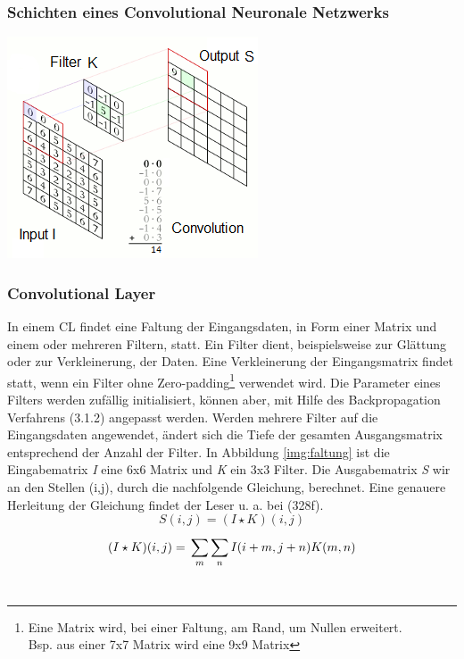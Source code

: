 \documentclass[twosided,a4,10pt]{article}
\begin{document}
\begin{multicols}{2}
		\subsubsection{Schichten eines Convolutional Neuronale Netzwerks}
		\begin{minipage}{0.45\textwidth}
			\centering
			\includegraphics{img/faltung2.png}
			\label{img:faltung}
		\end{minipage}\newline
		\subsubsection*{Convolutional Layer}
		In einem CL findet eine Faltung der Eingangsdaten, in Form einer Matrix und einem oder mehreren Filtern, statt. Ein Filter dient, beispielsweise zur Glättung oder zur Verkleinerung, der Daten. Eine Verkleinerung der Eingangsmatrix findet statt, wenn ein Filter ohne Zero-padding\footnote[12]{Eine Matrix wird, bei einer Faltung, am Rand, um Nullen erweitert.\\ Bsp. aus einer 7x7 Matrix wird eine 9x9 Matrix} verwendet wird. Die Parameter eines Filters werden zufällig initialisiert, können aber, mit Hilfe des Backpropagation Verfahrens (3.1.2) angepasst werden. Werden mehrere Filter auf die Eingangsdaten angewendet, ändert sich die Tiefe der gesamten Ausgangsmatrix entsprechend der Anzahl der Filter. \cite{karpathy}\newline
		In Abbildung \ref{img:faltung} ist die Eingabematrix \textit{I} eine 6x6 Matrix und \textit{K} ein 3x3 Filter. Die Ausgabematrix \textit{S} wir an den Stellen (i,j), durch die nachfolgende Gleichung, berechnet. Eine genauere Herleitung der Gleichung findet der Leser u. a. bei \cite{goodfellow}(328f).\newline\\	
		\begin{equation*}
		S(i,j) =(I \star K)(i,j)
		\end{equation*}
		\begin{equation*}
		(I \star K)(i,j) =\newline\sum_{m}^{}\sum_{n}^{}I(i+m,j+n)K(m,n)
		\end{equation*}\newline\\

\end{multicols}
\end{document}
